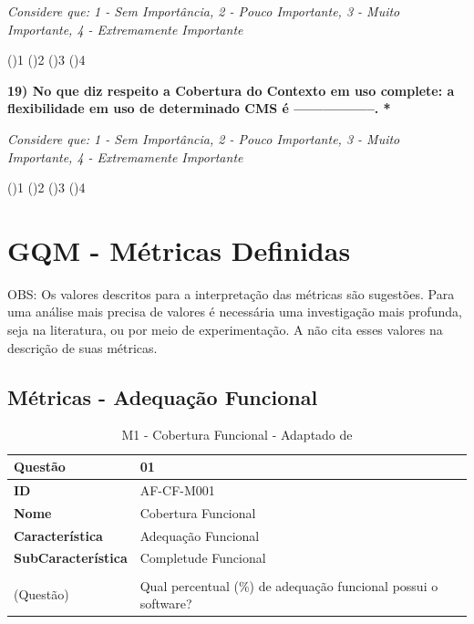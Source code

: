 \begin{apendicesenv}
\textit{Considere que: 1 - Sem Importância, 2 - Pouco Importante, 3 - Muito Importante, 4 - Extremamente Importante}

()1
()2
()3
()4


\textbf{19) No que diz respeito a Cobertura do Contexto em uso complete: a flexibilidade em uso de determinado CMS é {-----------------}. *}

\textit{Considere que: 1 - Sem Importância, 2 - Pouco Importante, 3 - Muito Importante, 4 - Extremamente Importante}

()1
()2
()3
()4


\chapter{GQM - Métricas Definidas}
\label{GQM-Métricas-Apendice}

OBS: Os valores descritos para a interpretação das métricas são sugestões. Para uma análise mais precisa de valores é necessária uma investigação mais profunda, seja na literatura, ou por meio de experimentação. A  não cita esses valores na descrição de suas métricas. 


\section{Métricas - Adequação Funcional}
\label{AdequaçãoFuncional}


\begin{longtable}{|p{115pt}|p{265pt}|}
 	\caption{M1 - Cobertura Funcional - Adaptado de } 
 	\label{M001}\\
 	\hline
 	 	 {\raggedright \textbf{Questão}}
 	 	 & {\raggedright {01}}\\
 	\hline
 	 {\raggedright \textbf{ID}}
 	 & {\raggedright {AF-CF-M001}}\\
 	
 	\hline
 		{\raggedright \textbf{Nome}}
 	 	 & {\raggedright Cobertura Funcional}
 	 	 \\\hline
 	 {\raggedright \textbf{Característica}}
 	 & {\raggedright   Adequação Funcional }\\	
 	\hline
 	 {\raggedright \textbf{SubCaracterística}}
 	 & {\raggedright Completude Funcional} 	
 \\	\hline
 	 {\raggedright \textbf{Descrição 
 	 \\(Questão)}} 
 	 & {\raggedright  Qual percentual (\%) de adequação funcional possui o software?} \\


\end{longtable}
\end{apendicesenv}
